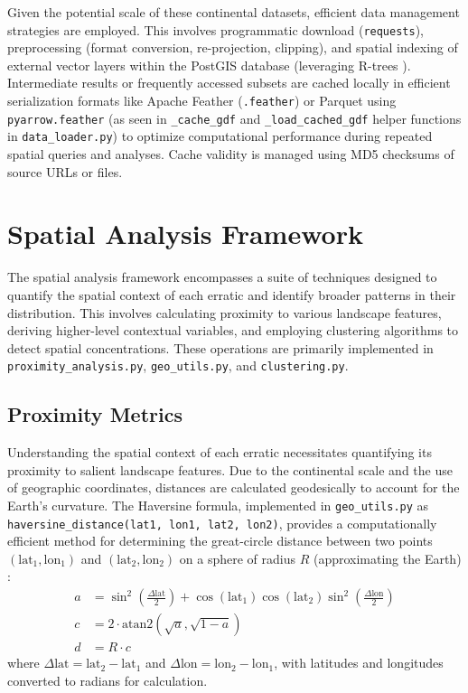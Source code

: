 \documentclass[
11pt, %
english, %
singlespacing, %
headsepline, %
]{MastersDoctoralThesis} %
\begin{document}
Given the potential scale of these continental datasets, efficient data management strategies are employed. This involves programmatic download (\texttt{requests}), preprocessing (format conversion, re-projection, clipping), and spatial indexing of external vector layers within the PostGIS database (leveraging R-trees \cite{Guttman1984}). Intermediate results or frequently accessed subsets are cached locally in efficient serialization formats like Apache Feather (\texttt{.feather}) or Parquet using \texttt{pyarrow.feather} (as seen in \texttt{\_cache\_gdf} and \texttt{\_load\_cached\_gdf} helper functions in \texttt{data\_loader.py}) to optimize computational performance during repeated spatial queries and analyses. Cache validity is managed using MD5 checksums of source URLs or files.

\section{Spatial Analysis Framework}
\label{sec:spatial_analysis}

The spatial analysis framework encompasses a suite of techniques designed to quantify the spatial context of each erratic and identify broader patterns in their distribution. This involves calculating proximity to various landscape features, deriving higher-level contextual variables, and employing clustering algorithms to detect spatial concentrations. 
These operations are primarily implemented in \\
\texttt{proximity\_analysis.py}, \texttt{geo\_utils.py}, and 
\texttt{clustering.py}.

\subsection{Proximity Metrics}
\label{subsec:proximity}

Understanding the spatial context of each erratic necessitates quantifying its proximity to salient landscape features. Due to the continental scale and the use of geographic coordinates, distances are calculated geodesically to account for the Earth's curvature. The Haversine formula, implemented in 
\texttt{geo\_utils.py} as \\
\texttt{haversine\_distance(lat1, lon1, lat2, lon2)}, 
provides a computationally efficient method for determining the great-circle distance between two points $(\text{lat}_1, \text{lon}_1)$ and $(\text{lat}_2, \text{lon}_2)$ on a sphere of radius $R$ (approximating the Earth) \cite{Sinnott1984}:
\begin{align*}
    a &= \sin^2\left(\frac{\Delta \text{lat}}{2}\right) + \cos(\text{lat}_1) \cos(\text{lat}_2) \sin^2\left(\frac{\Delta \text{lon}}{2}\right) \\
    c &= 2 \cdot \text{atan2}(\sqrt{a}, \sqrt{1-a}) \\
    d &= R \cdot c
\end{align*}
where $\Delta \text{lat} = \text{lat}_2 - \text{lat}_1$ and $\Delta \text{lon} = \text{lon}_2 - \text{lon}_1$, 
with latitudes and longitudes converted to radians for calculation.
\end{document}
